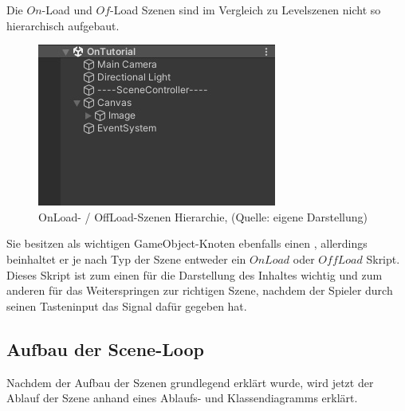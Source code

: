 Die $On$-Load und $Of$-Load Szenen sind im Vergleich zu Levelszenen nicht so hierarchisch aufgebaut.

\begin{figure}[ht]
\centering
\includegraphics[width=0.6\linewidth]{content/pictures/Detail_on_off.jpg}
\caption{OnLoad- / OffLoad-Szenen Hierarchie, (Quelle: eigene Darstellung)}
\label{fig:on_of_load_hierachy}
\end{figure}

Sie besitzen als wichtigen GameObject-Knoten ebenfalls einen , allerdings beinhaltet er je nach Typ der Szene entweder ein $OnLoad$ oder $OffLoad$ Skript. Dieses Skript ist zum einen für die Darstellung des Inhaltes wichtig und zum anderen für das Weiterspringen zur richtigen Szene, nachdem der Spieler durch seinen Tasteninput das Signal dafür gegeben hat.

\subsection{Aufbau der Scene-Loop}\label{sec:scene-loop}
Nachdem der Aufbau der Szenen grundlegend erklärt wurde, wird jetzt der Ablauf der Szene anhand eines Ablaufs- und Klassendiagramms erklärt.

